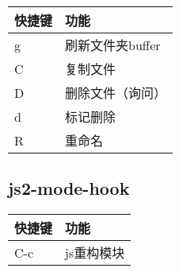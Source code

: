 \documentclass[11pt]{article}
\begin{document}
\begin{center}
\begin{tabular}{ll}
快捷键 & 功能\\
\hline
g & 刷新文件夹buffer\\
C & 复制文件\\
D & 删除文件（询问）\\
d & 标记删除\\
R & 重命名\\
\end{tabular}
\end{center}


\subsection{js2-mode-hook}
\label{sec:org78cd390}
\begin{center}
\begin{tabular}{ll}
快捷键 & 功能\\
\hline
C-c & js重构模块\\
\end{tabular}
\end{center}
\end{document}
